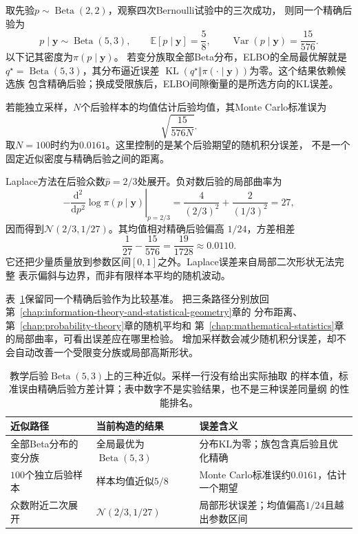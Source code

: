 \begin{example}[同一后验上的三种近似]
  \label{ex:future-posterior-approximation-comparison}
  取先验\(p\sim\operatorname{Beta}(2,2)\)，观察四次Bernoulli试验中的三次成功，
  则同一个精确后验为
  \[
    p\mid\bm y\sim\operatorname{Beta}(5,3),
    \qquad
    \mathbb{E}[p\mid\bm y]=\frac58,
    \qquad
    \operatorname{Var}(p\mid\bm y)=\frac{15}{576}.
  \]
  以下记其密度为\(\pi(p\mid\bm y)\)。
  若变分族取全部Beta分布，ELBO的全局最优解就是
  \(q^\star=\operatorname{Beta}(5,3)\)，其分布逼近误差
  \(\operatorname{KL}(q^\star\Vert \pi(\cdot\mid\bm y))\)为零。这个结果依赖候选族
  包含精确后验；换成受限族后，ELBO间隙衡量的是所选方向的KL误差。

  若能独立采样，\(N\)个后验样本的均值估计后验均值，其Monte Carlo标准误为
  \[
    \sqrt{\frac{15}{576N}}.
  \]
  取\(N=100\)时约为\(0.0161\)。这里控制的是某个后验期望的随机积分误差，
  不是一个固定近似密度与精确后验之间的距离。

  Laplace方法在后验众数\(\widehat p=2/3\)处展开。负对数后验的局部曲率为
  \[
    -\left.
    \frac{\mathrm d^2}{\mathrm dp^2}
    \log \pi(p\mid\bm y)
    \right|_{p=2/3}
    =
    \frac{4}{(2/3)^2}+\frac{2}{(1/3)^2}
    =27,
  \]
  因而得到\(\mathcal N(2/3,1/27)\)。其均值相对精确后验偏高
  \(1/24\)，方差相差
  \[
    \frac1{27}-\frac{15}{576}
    =
    \frac{19}{1728}
    \approx0.0110.
  \]
  它还把少量质量放到参数区间\([0,1]\)之外。Laplace误差来自局部二次形状无法完整
  表示偏斜与边界，而非有限样本平均的随机波动。
\end{example}

表~\ref{tab:future-posterior-approximations}保留同一个精确后验作为比较基准。
把三条路径分别放回第~\ref{chap:information-theory-and-statistical-geometry}章的
分布距离、第~\ref{chap:probability-theory}章的随机平均和
第~\ref{chap:mathematical-statistics}章的局部曲率，可看出误差应在哪里检验。
增加采样数会减少随机积分误差，却不会自动改善一个受限变分族或局部高斯形状。

\begin{table}[htbp]
  \centering
  \begin{tabularx}{\linewidth}{lXX}
    \toprule
    近似路径 & 当前构造的结果 & 误差含义\\
    \midrule
    全部Beta分布的变分族 & 全局最优为$\operatorname{Beta}(5,3)$ & 分布KL为零；族包含真后验且优化精确\\
    $100$个独立后验样本 & 样本均值近似$5/8$ & Monte Carlo标准误约$0.0161$，估计一个期望\\
    众数附近二次展开 & $\mathcal N(2/3,1/27)$ & 局部形状误差；均值偏高$1/24$且越出参数区间\\
    \bottomrule
  \end{tabularx}
  \caption{教学后验$\operatorname{Beta}(5,3)$上的三种近似。采样一行没有给出实际抽取
  的样本值，标准误由精确后验方差计算；表中数字不是实验结果，也不是三种误差同量纲
  的性能排名。}
  \label{tab:future-posterior-approximations}
\end{table}

